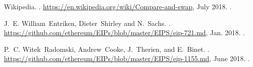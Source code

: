 \begin{thebibliography}{10}
Wikipedia.
.
\newblock \url{https://en.wikipedia.org/wiki/Compare-and-swap}, July 2018.
.

J.~E. William~Entriken, Dieter~Shirley and N.~Sachs.
.
\newblock \url{https://github.com/ethereum/EIPs/blob/master/EIPS/eip-721.md},
  Jan. 2018.
.

P.~C. Witek~Radomski, Andrew~Cooke, J.~Therien, and E.~Binet.
.
\newblock \url{https://github.com/ethereum/EIPs/blob/master/EIPS/eip-1155.md},
  June 2018.
.

\end{thebibliography}
